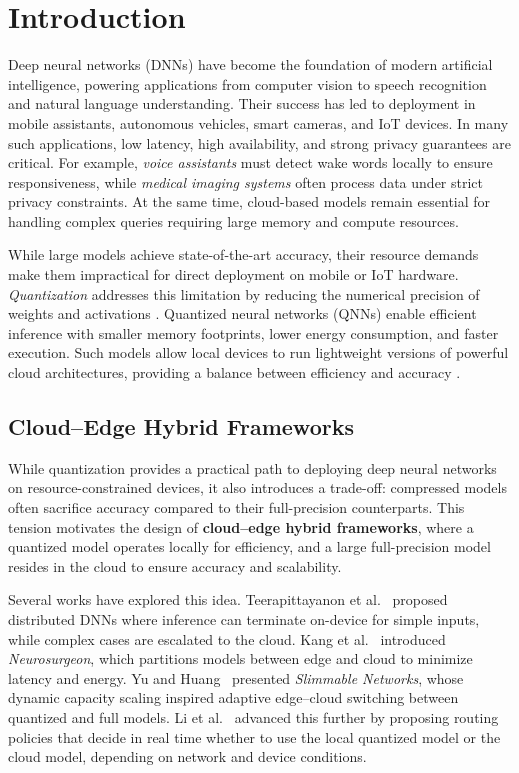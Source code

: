 \documentclass[11pt]{article}
\begin{document}
\section{Introduction}

Deep neural networks (DNNs) have become the foundation of modern artificial intelligence,
powering applications from computer vision to speech recognition and natural language
understanding. Their success has led to deployment in mobile assistants, autonomous
vehicles, smart cameras, and IoT devices. In many such applications, low latency,
high availability, and strong privacy guarantees are critical. For example, 
\emph{voice assistants} must detect wake words locally to ensure responsiveness,
while \emph{medical imaging systems} often process data under strict privacy constraints.
At the same time, cloud-based models remain essential for handling complex queries
requiring large memory and compute resources.

While large models achieve state-of-the-art accuracy, their resource demands
make them impractical for direct deployment on mobile or IoT hardware.
\emph{Quantization} addresses this limitation by reducing the numerical
precision of weights and activations \cite{gupta2015deep,hubara2017quantized}.
Quantized neural networks (QNNs) enable efficient inference with smaller
memory footprints, lower energy consumption, and faster execution.
Such models allow local devices to run lightweight versions of powerful
cloud architectures, providing a balance between efficiency and accuracy
\cite{jacob2018quantization}.

\subsection*{Cloud–Edge Hybrid Frameworks}

While quantization provides a practical path to deploying deep neural
networks on resource-constrained devices, it also introduces a trade-off:
compressed models often sacrifice accuracy compared to
their full-precision counterparts. This tension motivates the design of
\textbf{cloud–edge hybrid frameworks}, where a quantized model operates
locally for efficiency, and a large full-precision model resides in the
cloud to ensure accuracy and scalability.

Several works have explored this idea. Teerapittayanon et
al.~\cite{teerapittayanon2017distributed} proposed distributed DNNs
where inference can terminate on-device for simple inputs, while complex
cases are escalated to the cloud. Kang et al.~\cite{kang2017neurosurgeon}
introduced \emph{Neurosurgeon}, which partitions models between edge and
cloud to minimize latency and energy. Yu and Huang~\cite{yu2018slim}
presented \emph{Slimmable Networks}, whose dynamic capacity scaling
inspired adaptive edge–cloud switching between quantized and full models.
Li et al.~\cite{li2018edge} advanced this further by proposing routing
policies that decide in real time whether to use the local quantized
model or the cloud model, depending on network and device conditions.
\end{document}
